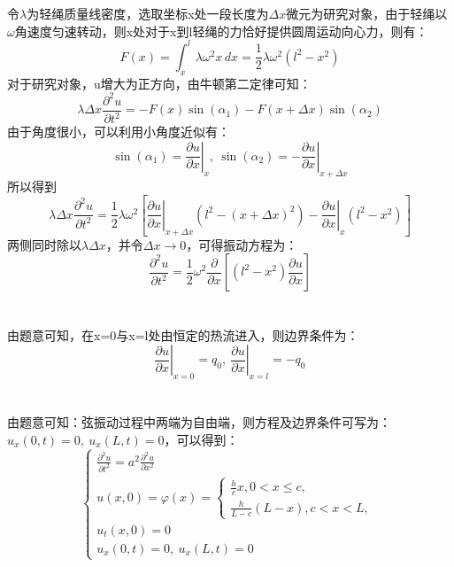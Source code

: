 \documentclass[10.5pt]{article}
\begin{document}
\section{}
令$\lambda$为轻绳质量线密度，选取坐标x处一段长度为$\Delta x$微元为研究对象，由于轻绳以$\omega$角速度匀速转动，则x处对于x到l轻绳的力恰好提供圆周运动向心力，则有：$$F(x)=\int_x^l \lambda \omega^2 x\,dx=\frac{1}{2}\lambda\omega^2(l^2-x^2)$$\indent
对于研究对象，u增大为正方向，由牛顿第二定律可知：$$\lambda \Delta x\frac{\partial^2u}{\partial t^2}=-F(x)\sin(\alpha_1)-F(x+\Delta x)\sin(\alpha_2)$$\indent
由于角度很小，可以利用小角度近似有：$$\sin(\alpha_1)=\left.\frac{\partial u}{\partial x}\right\rvert_{x},~\sin(\alpha_2)=-\left.\frac{\partial u}{\partial x}\right\rvert_{x+\Delta x}$$\indent
所以得到$$\lambda \Delta x\frac{\partial^2u}{\partial t^2} = \frac{1}{2}\lambda\omega^2 \left[\left.\frac{\partial u}{\partial x}\right\rvert_{x+\Delta x}(l^2-(x+\Delta x)^2) - \left.\frac{\partial u}{\partial x}\right\rvert_{x}(l^2-x^2)\right]$$\indent
两侧同时除以$\lambda\Delta x$，并令$\Delta x\to 0$，可得振动方程为：$$\frac{\partial^2 u}{\partial t^2}=\frac{1}{2}\omega^2 \frac{\partial}{\partial x}\left[(l^2-x^2)\frac{\partial u}{\partial x}\right]$$

\section{}
由题意可知，在x=0与x=l处由恒定的热流进入，则边界条件为：$$\left.\frac{\partial u}{\partial x}\right\rvert_{x=0}=q_0,~\left.\frac{\partial u}{\partial x}\right\rvert_{x=l}=-q_0$$

\section{}
由题意可知：弦振动过程中两端为自由端，则方程及边界条件可写为：$u_x(0,t)=0,~u_x(L,t)=0$，可以得到：
$$\begin{cases}
    \frac{\partial^2u}{\partial t^2}=a^2\frac{\partial^2u}{\partial x^2}\\
    u(x,0)=\varphi(x)=\begin{cases}
        \frac{h}{c}x,0<x\leqslant c,\\
        \frac{h}{L-c}(L-x),c<x<L,
    \end{cases}\\
    u_t(x,0)=0\\
    u_x(0,t)=0,~u_x(L,t)=0
\end{cases}$$\indent
\end{document}
